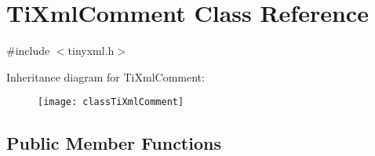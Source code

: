 \hypertarget{classTiXmlComment}{\section{Ti\-Xml\-Comment Class Reference}
\label{classTiXmlComment}
}


{\ttfamily \#include $<$tinyxml.\-h$>$}

Inheritance diagram for Ti\-Xml\-Comment\-:\begin{figure}[H]
\begin{center}
\leavevmode
\texttt{[image: classTiXmlComment]}
\end{center}
\end{figure}
\subsection*{Public Member Functions}
